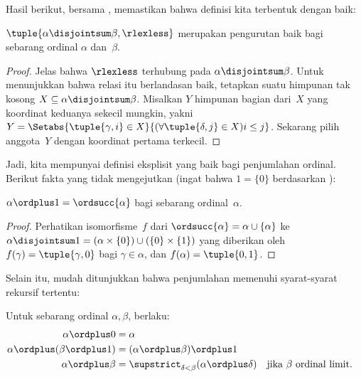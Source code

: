 \documentclass[../../../include/open-logic-section]{subfiles}
\begin{document}
Hasil berikut, bersama
, memastikan bahwa definisi
kita terbentuk dengan baik:

\begin{lem}
$\tuple{\alpha\disjointsum\beta,\rlexless}$ merupakan pengurutan baik bagi
sebarang ordinal $\alpha$ dan~$\beta$.
\end{lem}

\begin{proof}
Jelas bahwa $\rlexless$ terhubung pada $\alpha\disjointsum\beta$. Untuk
menunjukkan bahwa relasi itu berlandasan baik, tetapkan suatu himpunan tak
kosong $X\subseteq\alpha\disjointsum\beta$. Misalkan $Y$ himpunan bagian
dari~$X$ yang koordinat keduanya sekecil mungkin, yakni
$Y=\Setabs{\tuple{\gamma,i}\in X}{(\forall\tuple{\delta,j}\in X)i\leq j}$.
Sekarang pilih anggota~$Y$ dengan koordinat pertama terkecil.
\end{proof}
\noindent
Jadi, kita mempunyai definisi eksplisit yang baik bagi penjumlahan ordinal.
Berikut fakta yang tidak mengejutkan (ingat bahwa $1=\{0\}$ berdasarkan
):
\begin{prop}
$\alpha\ordplus1=\ordsucc{\alpha}$ bagi sebarang ordinal~$\alpha$.
\end{prop}

\begin{proof}
Perhatikan isomorfisme~$f$ dari
$\ordsucc{\alpha}=\alpha\cup\{\alpha\}$ ke
$\alpha\disjointsum1=(\alpha\times\{0\})\cup(\{0\}\times\{1\})$ yang
diberikan oleh $f(\gamma)=\tuple{\gamma,0}$ bagi $\gamma\in\alpha$, dan
$f(\alpha)=\tuple{0,1}$.
\end{proof}
\noindent
Selain itu, mudah ditunjukkan bahwa penjumlahan memenuhi syarat-syarat
rekursif tertentu:

\begin{lem}
Untuk sebarang ordinal $\alpha,\beta$, berlaku:
\begin{align*}
	\alpha\ordplus 0 &= \alpha\\
	\alpha \ordplus  (\beta\ordplus 1) &= (\alpha \ordplus  \beta) \ordplus  1\\
	\alpha  \ordplus  \beta &= \supstrict_{\delta < \beta}(\alpha \ordplus  \delta) && \text{jika $\beta$ ordinal limit.}
\end{align*}
\end{lem}
\end{document}
